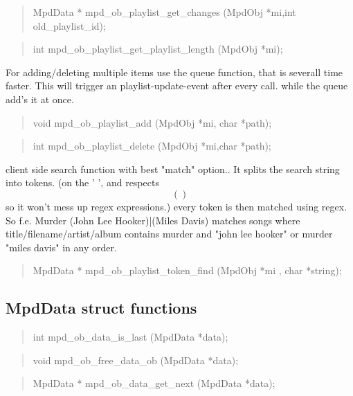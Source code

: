 \documentclass[a4paper,11pt]{article}
\begin{document}
\begin{quote}
MpdData *  mpd\_ob\_playlist\_get\_changes  (MpdObj *mi,int old\_playlist\_id);
\end{quote}
\begin{quote}
int  mpd\_ob\_playlist\_get\_playlist\_length (MpdObj *mi);
\end{quote}

For adding/deleting multiple items use the queue function, that is severall time faster.
This will trigger an playlist-update-event after every call. while the queue add's it at once.
\begin{quote}
void  mpd\_ob\_playlist\_add   (MpdObj *mi, char *path);
\end{quote}

\begin{quote}
int   mpd\_ob\_playlist\_delete   (MpdObj *mi,char *path);
\end{quote}

client side search function with best "match" option..
It splits the search string into tokens. (on the ' ', and respects \[()\] so it won't mess up regex expressions.)  every token is then matched using regex.
So f.e. Murder (John Lee Hooker)|(Miles Davis)  matches songs where title/filename/artist/album contains murder and "john lee hooker" 
or murder "miles davis" in any order.\\
{\color{red}{Warning: This function can be slow. For better performance use the server side use.}}

\begin{quote}
MpdData * mpd\_ob\_playlist\_token\_find  (MpdObj *mi , char *string);
\end{quote}

\subsection{MpdData struct functions}

\begin{quote}
int   mpd\_ob\_data\_is\_last   (MpdData *data);
\end{quote}

\begin{quote}
void   mpd\_ob\_free\_data\_ob   (MpdData *data);
\end{quote}

\begin{quote}
MpdData *  mpd\_ob\_data\_get\_next   (MpdData *data);
\end{quote}
\end{document}
